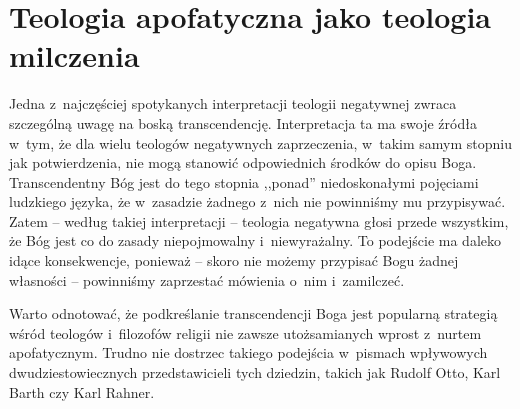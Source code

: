 

\chapter{Teologia apofatyczna jako teologia milczenia}\label{sil-general}




Jedna z~najczęściej spotykanych interpretacji teologii negatywnej zwraca szczególną uwagę na boską transcendencję. Interpretacja ta ma swoje źródła w~tym, że dla wielu teologów negatywnych zaprzeczenia, w~takim samym stopniu jak potwierdzenia, nie mogą stanowić odpowiednich środków do opisu Boga. Transcendentny Bóg jest do tego stopnia ,,ponad'' niedoskonałymi pojęciami ludzkiego języka, że w~zasadzie żadnego z~nich nie powinniśmy mu przypisywać. Zatem -- według takiej interpretacji -- teologia negatywna głosi przede wszystkim, że Bóg jest co do zasady niepojmowalny i~niewyrażalny. To podejście ma daleko idące konsekwencje, ponieważ -- skoro nie możemy przypisać Bogu żadnej własności -- powinniśmy zaprzestać mówienia o~nim i~zamilczeć.


Warto odnotować, że podkreślanie transcendencji Boga jest popularną strategią wśród teologów i~filozofów religii nie zawsze utożsamianych wprost z~nurtem apofatycznym. Trudno nie dostrzec takiego podejścia w~pismach wpływowych dwudziestowiecznych przedstawicieli tych dziedzin, takich jak Rudolf Otto, Karl Barth czy Karl Rahner.

